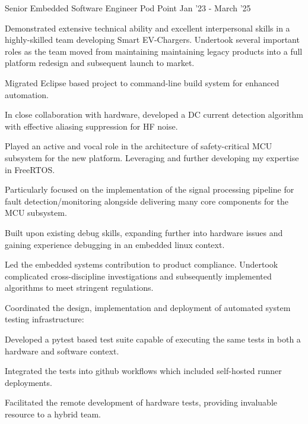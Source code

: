 

\begin{cventries}


  \cventry
    {Senior Embedded Software Engineer}
    {Pod Point}
    {}
    {Jan '23 - March '25}
    { 
      Demonstrated extensive technical ability and excellent interpersonal skills in a highly-skilled team developing Smart EV-Chargers. Undertook several important roles as the team moved from maintaining maintaining legacy products into a full platform redesign and subsequent launch to market.
      \begin{cvitems}
        \item{Migrated Eclipse based project to command-line build system for enhanced automation.}
        \item{In close collaboration with hardware, developed a DC current detection algorithm with effective aliasing suppression for HF noise.}
        \item{Played an active and vocal role in the architecture of safety-critical MCU subsystem for the new platform. Leveraging and further developing my expertise in FreeRTOS.}
        \item{Particularly focused on the implementation of the  signal processing pipeline for fault detection/monitoring alongside delivering many core components for the MCU subsystem.}
        \item{Built upon existing debug skills, expanding further into hardware issues and gaining experience debugging in an embedded linux context.}
        \item{Led the embedded systems contribution to product compliance. Undertook complicated cross-discipline investigations and subsequently implemented algorithms to meet stringent regulations.}
        \item{Coordinated the design, implementation and deployment of automated system testing infrastructure:}
        \begin{cvitems}
          \item{Developed a pytest based test suite capable of executing the same tests in both a hardware and software context.}
          \item{Integrated the tests into github workflows which included self-hosted runner deployments.}
          \item{Facilitated the remote development of hardware tests, providing invaluable resource to a hybrid team.}
        \end{cvitems}
      \end{cvitems}  
    }


\end{cventries}
